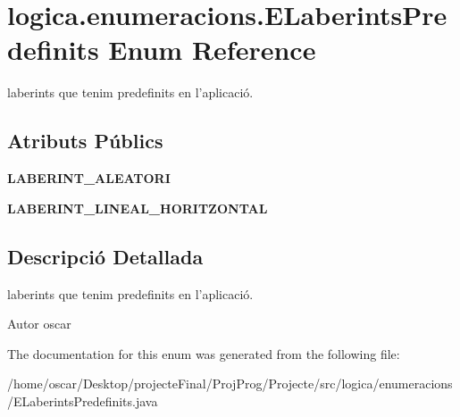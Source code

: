 \hypertarget{enumlogica_1_1enumeracions_1_1_e_laberints_predefinits}{\section{logica.\+enumeracions.\+E\+Laberints\+Predefinits Enum Reference}
\label{enumlogica_1_1enumeracions_1_1_e_laberints_predefinits}
}


laberints que tenim predefinits en l'aplicació.  


\subsection*{Atributs Públics}
\begin{DoxyCompactItemize}
\item 
\hypertarget{enumlogica_1_1enumeracions_1_1_e_laberints_predefinits_a9a31f811f66ac2a2decdbdd4526d8e4c}{{\bfseries L\+A\+B\+E\+R\+I\+N\+T\+\_\+\+A\+L\+E\+A\+T\+O\+R\+I}}\label{enumlogica_1_1enumeracions_1_1_e_laberints_predefinits_a9a31f811f66ac2a2decdbdd4526d8e4c}

\item 
\hypertarget{enumlogica_1_1enumeracions_1_1_e_laberints_predefinits_ae4d74c390c4738abcef89354399001ac}{{\bfseries L\+A\+B\+E\+R\+I\+N\+T\+\_\+\+L\+I\+N\+E\+A\+L\+\_\+\+H\+O\+R\+I\+T\+Z\+O\+N\+T\+A\+L}}\label{enumlogica_1_1enumeracions_1_1_e_laberints_predefinits_ae4d74c390c4738abcef89354399001ac}

\end{DoxyCompactItemize}


\subsection{Descripció Detallada}
laberints que tenim predefinits en l'aplicació. 

\begin{DoxyAuthor}{Autor}
oscar 
\end{DoxyAuthor}


The documentation for this enum was generated from the following file\+:\begin{DoxyCompactItemize}
\item 
/home/oscar/\+Desktop/projecte\+Final/\+Proj\+Prog/\+Projecte/src/logica/enumeracions/E\+Laberints\+Predefinits.\+java\end{DoxyCompactItemize}

